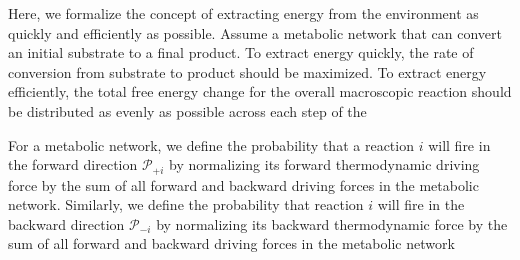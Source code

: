 Here, we formalize the concept of extracting energy from the environment as quickly and efficiently as possible. Assume a metabolic network that can convert an initial substrate to a final product. To extract energy quickly, the rate of conversion from substrate to product should be maximized.  To extract energy efficiently, the total free energy change for the overall macroscopic reaction should be distributed as evenly as possible across each step of the 


For a metabolic network, we define the probability that a reaction $i$ will fire in the forward  direction ${\mathcal P_{+i}}$ by normalizing its forward thermodynamic driving force by the sum of all forward and backward driving forces in the metabolic network. Similarly, we define the probability that reaction $i$ will fire in the backward direction $\mathcal P_{-i}$ by normalizing its backward thermodynamic force by  the sum of all forward and backward driving forces in the metabolic network